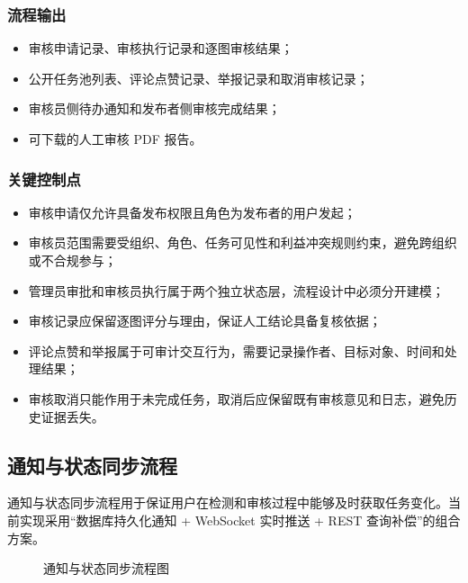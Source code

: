 \subsubsection{流程输出}
\begin{itemize}[leftmargin=2em]
    \item 审核申请记录、审核执行记录和逐图审核结果；
    \item 公开任务池列表、评论点赞记录、举报记录和取消审核记录；
    \item 审核员侧待办通知和发布者侧审核完成结果；
    \item 可下载的人工审核 PDF 报告。
\end{itemize}

\subsubsection{关键控制点}
\begin{itemize}[leftmargin=2em]
    \item 审核申请仅允许具备发布权限且角色为发布者的用户发起；
    \item 审核员范围需要受组织、角色、任务可见性和利益冲突规则约束，避免跨组织或不合规参与；
    \item 管理员审批和审核员执行属于两个独立状态层，流程设计中必须分开建模；
    \item 审核记录应保留逐图评分与理由，保证人工结论具备复核依据；
    \item 评论点赞和举报属于可审计交互行为，需要记录操作者、目标对象、时间和处理结果；
    \item 审核取消只能作用于未完成任务，取消后应保留既有审核意见和日志，避免历史证据丢失。
\end{itemize}

\subsection{通知与状态同步流程}
通知与状态同步流程用于保证用户在检测和审核过程中能够及时获取任务变化。当前实现采用“数据库持久化通知 + WebSocket 实时推送 + REST 查询补偿”的组合方案。

\begin{figure}[H]
    \centering
    \resizebox{0.98\textwidth}{!}{}
    \caption{通知与状态同步流程图}
\end{figure}

